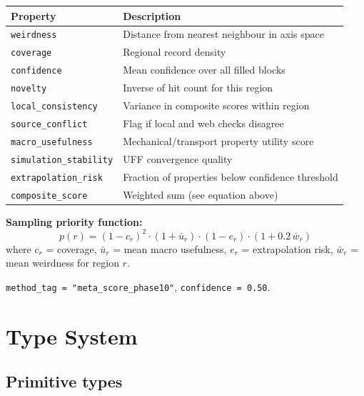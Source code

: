 \documentclass[11pt,letterpaper]{article}
\begin{document}
\begin{center}
\begin{tabular}{ll}
\toprule
Property & Description \\
\midrule
\texttt{weirdness}           & Distance from nearest neighbour in axis space \\
\texttt{coverage}            & Regional record density \\
\texttt{confidence}          & Mean confidence over all filled blocks \\
\texttt{novelty}             & Inverse of hit count for this region \\
\texttt{local\_consistency}  & Variance in composite scores within region \\
\texttt{source\_conflict}    & Flag if local and web checks disagree \\
\texttt{macro\_usefulness}   & Mechanical/transport property utility score \\
\texttt{simulation\_stability} & UFF convergence quality \\
\texttt{extrapolation\_risk} & Fraction of properties below confidence threshold \\
\texttt{composite\_score}    & Weighted sum (see equation above) \\
\bottomrule
\end{tabular}
\end{center}

\textbf{Sampling priority function:}
\begin{equation}
  p(r) = (1 - c_r)^{2} \cdot (1 + \bar{u}_r) \cdot (1 - e_r) \cdot (1 + 0.2\,\bar{w}_r)
\end{equation}
where $c_r$ = coverage, $\bar{u}_r$ = mean macro usefulness, $e_r$ = extrapolation
risk, $\bar{w}_r$ = mean weirdness for region $r$.

\texttt{method\_tag = "meta\_score\_phase10"}, \texttt{confidence = 0.50}.

\section{Type System}

\subsection{Primitive types}
\end{document}
